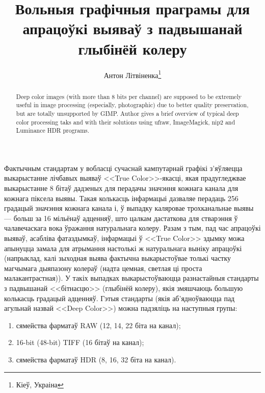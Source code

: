 \documentclass[10pt, a5paper]{article}
\begin{document}
\title{Вольныя графічныя праграмы для апрацоўкі выяваў з падвышанай глыбінёй колеру}%

\author{Антон Літвіненка\footnote{Кіеў, Украіна}}
\maketitle

 \begin{abstract}
  Deep color images (with more than 8 bits per channel) are supposed to be extremely useful in image processing (especially, photographic) due to better quality preservation, but are totally unsupported by GIMP. Author gives a brief overview of typical deep color processing taks and with their solutions using ufraw, ImageMagick, nip2 and Luminance HDR programs.
 \end{abstract}

Фактычным стандартам у вобласці сучаснай кампутарнай графікі з'яўляецца выкарыстанне лічбавых выяваў <<True Color>>-якасці, якая прадугледжвае выкарыстанне 8 бітаў дадзеных для перадачы значэння кожнага канала для кожнага піксела выявы. Такая колькасць інфармацыі дазваляе перадаць 256 градацый значэння кожнага канала і, ў выпадку каляровае трохканальнае выявы --- больш за 16 мільёнаў адценняў, што цалкам дастаткова для стварэння ў чалавечаскага вока ўражання натуральнага колеру. Разам з тым, пад час апрацоўкі выяваў, асабліва фатаздымкаў, інфармацыі ў <<True Color>> здымку можа апынуцца замала для атрымання настолькі ж натуральнага выніку апрацоўкі (напрыклад, калі зыходная выява фактычна выкарыстоўвае толькі частку магчымага дыяпазону колераў (надта цемная, светлая ці проста малакантрастная)). У такіх выпадках выкарыстоўваюцца разнастайныя стандарты з падвышанай <<бітнасцю>> (глыбінёй колеру), якія змяшчаюць большую колькасць градацый адценняў. Гэтыя стандарты (якія аб'ядноўваюцца пад агульнай назвай <<Deep Color>>) можна падзяліць на наступныя групы:

\begin{enumerate}
 \item сямейства фарматаў RAW (12, 14, 22 біта на канал);
 \item 16-bit (48-bit) TIFF (16 бітаў на канал);
 \item сямейства фарматаў HDR (8, 16, 32 біта на канал).
\end{enumerate}
 
\end{document}
